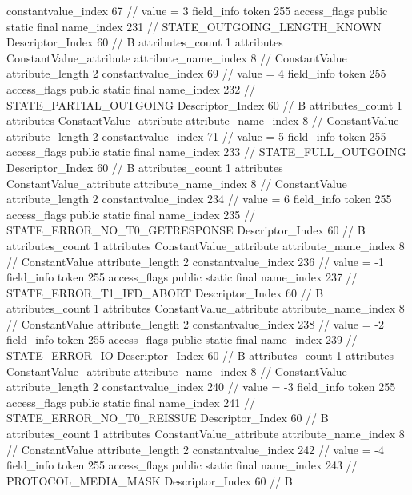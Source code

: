 {{{{{{{					constantvalue_index	67		// value = 3
				}
				}
			}
			field_info {
				token	255
				access_flags	public static final
				name_index	231		// STATE_OUTGOING_LENGTH_KNOWN
				Descriptor_Index	60		// B
				attributes_count	1
				attributes {
				ConstantValue_attribute {
					attribute_name_index	8		// ConstantValue
					attribute_length	2
					constantvalue_index	69		// value = 4
				}
				}
			}
			field_info {
				token	255
				access_flags	public static final
				name_index	232		// STATE_PARTIAL_OUTGOING
				Descriptor_Index	60		// B
				attributes_count	1
				attributes {
				ConstantValue_attribute {
					attribute_name_index	8		// ConstantValue
					attribute_length	2
					constantvalue_index	71		// value = 5
				}
				}
			}
			field_info {
				token	255
				access_flags	public static final
				name_index	233		// STATE_FULL_OUTGOING
				Descriptor_Index	60		// B
				attributes_count	1
				attributes {
				ConstantValue_attribute {
					attribute_name_index	8		// ConstantValue
					attribute_length	2
					constantvalue_index	234		// value = 6
				}
				}
			}
			field_info {
				token	255
				access_flags	public static final
				name_index	235		// STATE_ERROR_NO_T0_GETRESPONSE
				Descriptor_Index	60		// B
				attributes_count	1
				attributes {
				ConstantValue_attribute {
					attribute_name_index	8		// ConstantValue
					attribute_length	2
					constantvalue_index	236		// value = -1
				}
				}
			}
			field_info {
				token	255
				access_flags	public static final
				name_index	237		// STATE_ERROR_T1_IFD_ABORT
				Descriptor_Index	60		// B
				attributes_count	1
				attributes {
				ConstantValue_attribute {
					attribute_name_index	8		// ConstantValue
					attribute_length	2
					constantvalue_index	238		// value = -2
				}
				}
			}
			field_info {
				token	255
				access_flags	public static final
				name_index	239		// STATE_ERROR_IO
				Descriptor_Index	60		// B
				attributes_count	1
				attributes {
				ConstantValue_attribute {
					attribute_name_index	8		// ConstantValue
					attribute_length	2
					constantvalue_index	240		// value = -3
				}
				}
			}
			field_info {
				token	255
				access_flags	public static final
				name_index	241		// STATE_ERROR_NO_T0_REISSUE
				Descriptor_Index	60		// B
				attributes_count	1
				attributes {
				ConstantValue_attribute {
					attribute_name_index	8		// ConstantValue
					attribute_length	2
					constantvalue_index	242		// value = -4
				}
				}
			}
			field_info {
				token	255
				access_flags	public static final
				name_index	243		// PROTOCOL_MEDIA_MASK
				Descriptor_Index	60		// B
}}}}}
